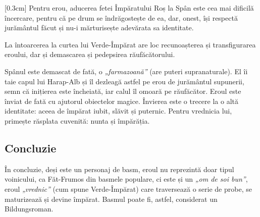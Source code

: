 [0.3cm]
Pentru erou, aducerea fetei Împăratului Roș la Spân este cea mai dificilă încercare, pentru că pe drum se îndrăgostește de ea, dar, onest, își respectă jurământul făcut și nu-i mărturisește adevărata sa identitate.

La întoarcerea la curtea lui Verde-Împărat are loc recunoașterea și transfigurarea eroului, dar și demascarea și pedepsirea răufăcătorului.

Spânul este demascat de fată, o \textit{„farmazoană”} (are puteri supranaturale). El îi taie capul lui Harap-Alb și îl dezleagă astfel pe erou de jurământul supunerii, semn că inițierea este încheiată, iar calul îl omoară pe răufăcător. Eroul este înviat de fată cu ajutorul obiectelor magice. Învierea este o trecere la o altă identitate: aceea de împărat iubit, slăvit și puternic. Pentru vrednicia lui, primește răsplata cuvenită: nunta și împărăția.


\subsection{Concluzie}

În concluzie, deși este un personaj de basm, eroul nu reprezintă doar tipul voinicului, ca Făt-Frumos din basmele populare, ci este și un \textit{„om de soi bun”}, eroul \textit{„vrednic”} (cum spune Verde-Împărat) care traversează o serie de probe, se maturizează și devine împărat. Basmul poate fi, astfel, considerat un Bildungsroman.

